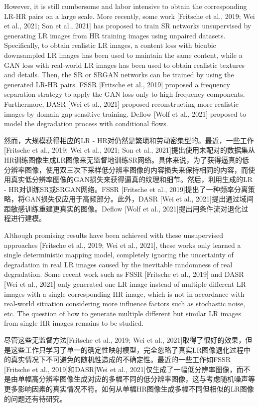 However, it is still cumbersome and labor intensive to obtain the corresponding LR-HR pairs on a large scale. More recently, some work [Fritsche et al., 2019; Wei et al., 2021; Son et al., 2021] has proposed to train SR networks unsupervised by generating LR images from HR training images using unpaired datasets. Specifically, to obtain realistic LR images, a content loss with bicubic downsampled LR images has been used to maintain the same content, while a GAN loss with real-world LR images has been used to obtain realistic textures and details. Then, the SR or SRGAN networks can be trained by using the generated LR-HR pairs. FSSR [Fritsche et al., 2019] proposed a frequency separation strategy to apply the GAN loss only to high-frequency components. Furthermore, DASR [Wei et al., 2021] proposed reconstructing more realistic images by domain gap-sensitive training. Deflow [Wolf et al., 2021] proposed to model the degradation process with conditional flows.

然而，大规模获得相应的LR - HR对仍然是繁琐和劳动密集型的。最近，一些工作[Fritsche et al., 2019; Wei et al., 2021; Son et al., 2021]提出使用未配对的数据集从HR训练图像生成LR图像来无监督地训练SR网络。具体来说，为了获得逼真的低分辨率图像，使用双三次下采样低分辨率图像的内容损失来保持相同的内容，而使用真实低分辨率图像的GAN损失来获得逼真的纹理和细节。然后，利用生成的LR - HR对训练SR或SRGAN网络。FSSR [Fritsche et al., 2019]提出了一种频率分离策略，将GAN损失仅应用于高频部分。此外，DASR [Wei et al., 2021]提出通过域间距敏感训练重建更真实的图像。Deflow [Wolf et al., 2021]提出用条件流对退化过程进行建模。

Although promising results have been achieved with these unsupervised approaches [Fritsche et al., 2019; Wei et al., 2021], these works only learned a single deterministic mapping model, completely ignoring the uncertainty of degradation in real LR images caused by the inevitable randomness of real degradation. Some recent work such as FSSR [Fritsche et al., 2019] and DASR [Wei et al., 2021] only generated one LR image instead of multiple different LR images with a single corresponding HR image, which is not in accordance with real-world situation considering more influence factors such as stochastic noise, etc. The question of how to generate multiple different but similar LR images from single HR images remains to be studied.

尽管这些无监督方法[Fritsche et al., 2019; Wei et al., 2021]取得了很好的效果，但是这些工作只学习了单一的确定性映射模型，完全忽略了真实LR图像退化过程中的真实情况下不可避免的随机性造成的不确定性。最近的一些工作如FSSR [Fritsche et al., 2019]和DASR[Wei et al., 2021]仅生成了一幅低分辨率图像，而不是由单幅高分辨率图像生成对应的多幅不同的低分辨率图像，这与考虑随机噪声等更多影响因素的真实情况不符。如何从单幅HR图像生成多幅不同但相似的LR图像的问题还有待研究。

